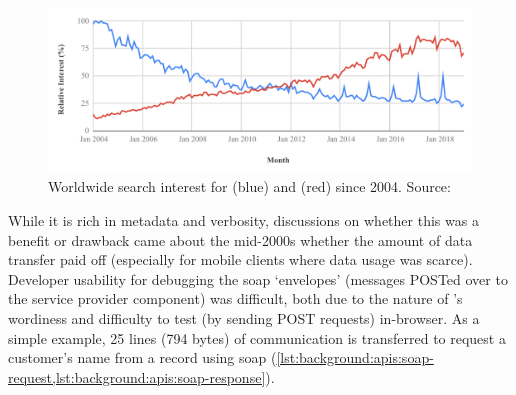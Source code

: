 \begin{figure}[h!]
  \centering
  \includegraphics[width=\linewidth]{rest-vs-soap}
  \caption[SOAP versus REST search interest over time]{Worldwide search interest for  (blue) and  (red) since 2004. Source:~\citep{Anonymous:Ey7UCSJb}}
  \label{fig:background:apis:rest-vs-soap}
\end{figure}

While it is rich in metadata and verbosity, discussions on whether this was a benefit or drawback came about the mid-2000s \citep{zurMuehlen:2005ci,Pautasso:2008uw} whether the amount of data transfer paid off (especially for mobile clients where data usage was scarce). Developer usability for debugging the \gls{soap} `envelopes' (messages POSTed over  to the service provider component) was difficult, both due to the nature of 's wordiness and difficulty to test (by sending POST requests) in-browser. As a simple example, 25 lines (794 bytes) of  communication is transferred to request a customer's name from a record using \gls{soap} (\cref{lst:background:apis:soap-request,lst:background:apis:soap-response}). 

